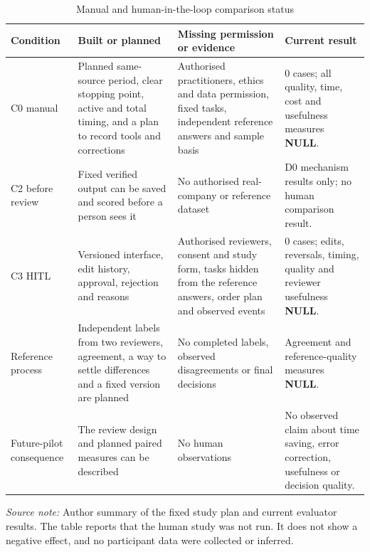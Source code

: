 \clearpage
\begin{table}[p]
  \centering
  \scriptsize
  \setlength{\tabcolsep}{3pt}
  \renewcommand{\arraystretch}{1.08}
  \begin{tabularx}{\textwidth}{@{}P{0.17\textwidth}P{0.26\textwidth}P{0.24\textwidth}Y@{}}
    \toprule
    \textbf{Condition} & \textbf{Built or planned} & \textbf{Missing permission or evidence} & \textbf{Current result} \\
    \midrule
    C0 manual & Planned same-source period, clear stopping point, active and total timing, and a plan to record tools and corrections & Authorised practitioners, ethics and data permission, fixed tasks, independent reference answers and sample basis & 0 cases; all quality, time, cost and usefulness measures \textbf{NULL}. \\
    \addlinespace
    C2 before review & Fixed verified output can be saved and scored before a person sees it & No authorised real-company or reference dataset & D0 mechanism results only; no human comparison result. \\
    \addlinespace
    C3 HITL & Versioned interface, edit history, approval, rejection and reasons & Authorised reviewers, consent and study form, tasks hidden from the reference answers, order plan and observed events & 0 cases; edits, reversals, timing, quality and reviewer usefulness \textbf{NULL}. \\
    \addlinespace
    Reference process & Independent labels from two reviewers, agreement, a way to settle differences and a fixed version are planned & No completed labels, observed disagreements or final decisions & Agreement and reference-quality measures \textbf{NULL}. \\
    \addlinespace
    Future-pilot consequence & The review design and planned paired measures can be described & No human observations & No observed claim about time saving, error correction, usefulness or decision quality. \\
    \bottomrule
  \end{tabularx}

  \caption{Manual and human-in-the-loop comparison status}
  \label{tab:eval-human-comparison-status}

  \vspace{4pt}
  \parbox{\textwidth}{\scriptsize
    \textit{Source note:} Author summary of the fixed study plan and current evaluator results. The
    table reports that the human study was not run. It does not show a negative effect, and no
    participant data were collected or inferred.}
\end{table}
\clearpage
